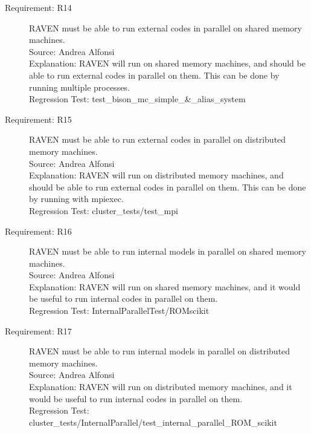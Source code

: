 \documentclass{article}
\newcommand{\requirement}[5]{\item[Requirement: #1] #2 \\Source: #3\\Explanation: #4\\Regression Test: #5}
\begin{document}
\begin{description}
\requirement{R14}{RAVEN must be able to run external codes in parallel on shared memory machines.}
{Andrea Alfonsi}
{RAVEN will run on shared memory machines, and should be able to run external codes in parallel on them.  This can be done by running multiple processes.}
{test\_bison\_mc\_simple\_\&\_alias\_system}

\requirement{R15}{RAVEN must be able to run external codes in parallel on distributed memory machines.}
{Andrea Alfonsi}
{RAVEN will run on distributed memory machines, and should be able to run external codes in parallel on them.  This can be done by running with mpiexec.}
{cluster\_tests/test\_mpi}

\requirement{R16}{RAVEN must be able to run internal models in parallel on shared memory machines.}
{Andrea Alfonsi}
{RAVEN will run on shared memory machines, and it would be useful to run internal codes in parallel on them.}
{InternalParallelTest/ROMscikit}

\requirement{R17}{RAVEN must be able to run internal models in parallel on distributed memory machines.}
{Andrea Alfonsi}
{RAVEN will run on distributed memory machines, and it would be useful to run internal codes in parallel on them.}
{cluster\_tests/InternalParallel/test\_internal\_parallel\_ROM\_scikit}

\end{description}
\end{document}

